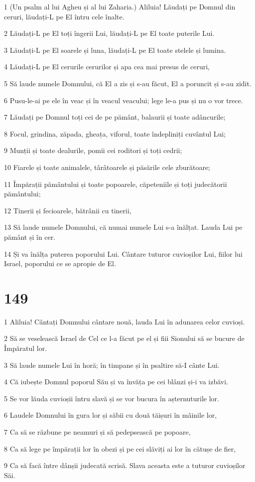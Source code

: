 \par 1 (Un psalm al lui Agheu și al lui Zaharia.) Aliluia! Lăudați pe Domnul din ceruri, lăudați-L pe El întru cele înalte.
\par 2 Lăudați-L pe El toți îngerii Lui, lăudați-L pe El toate puterile Lui.
\par 3 Lăudați-L pe El soarele și luna, lăudați-L pe El toate stelele și lumina.
\par 4 Lăudați-L pe El cerurile cerurilor și apa cea mai presus de ceruri,
\par 5 Să laude numele Domnului, că El a zis și s-au făcut, El a poruncit și s-au zidit.
\par 6 Pusu-le-ai pe ele în veac și în veacul veacului; lege le-a pus și nu o vor trece.
\par 7 Lăudați pe Domnul toți cei de pe pământ, balaurii și toate adâncurile;
\par 8 Focul, grindina, zăpada, gheața, viforul, toate îndepliniți cuvântul Lui;
\par 9 Munții și toate dealurile, pomii cei roditori și toți cedrii;
\par 10 Fiarele și toate animalele, târâtoarele și păsările cele zburătoare;
\par 11 Împărații pământului și toate popoarele, căpeteniile și toți judecătorii pământului;
\par 12 Tinerii și fecioarele, bătrânii cu tinerii,
\par 13 Să laude numele Domnului, că numai numele Lui s-a înălțat. Lauda Lui pe pământ și în cer.
\par 14 Și va înălța puterea poporului Lui. Cântare tuturor cuvioșilor Lui, fiilor lui Israel, poporului ce se apropie de El.

\chapter{149}

\par 1 Aliluia! Cântați Domnului cântare nouă, lauda Lui în adunarea celor cuvioși.
\par 2 Să se veselească Israel de Cel ce l-a făcut pe el și fiii Sionului să se bucure de Împăratul lor.
\par 3 Să laude numele Lui în horă; în timpane și în psaltire să-I cânte Lui.
\par 4 Că iubește Domnul poporul Său și va învăța pe cei blânzi și-i va izbăvi.
\par 5 Se vor lăuda cuvioșii întru slavă și se vor bucura în așternuturile lor.
\par 6 Laudele Domnului în gura lor și săbii cu două tăișuri în mâinile lor,
\par 7 Ca să se răzbune pe neamuri și să pedepsească pe popoare,
\par 8 Ca să lege pe împărații lor în obezi și pe cei slăviți ai lor în cătușe de fier,
\par 9 Ca să facă între dânșii judecată scrisă. Slava aceasta este a tuturor cuvioșilor Săi.

